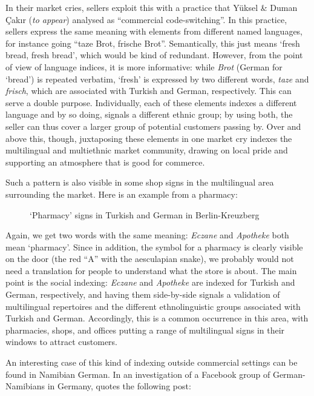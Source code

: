In their market cries, sellers exploit this with a practice that Yüksel \& Duman Çakır (\textit{to appear}) analysed as “commercial code-switching”. In this practice, sellers express the same meaning with elements from different named languages, for instance going “taze Brot, frische Brot”. Semantically, this just means `fresh bread, fresh bread', which would be kind of redundant. However, from the point of view of language indices, it is more informative: while \textit{Brot} (German for ‘bread’) is repeated verbatim, ‘fresh’ is expressed by two different words, \textit{taze} and \textit{frisch}, which are associated with Turkish and German, respectively. This can serve a double purpose. Individually, each of these elements indexes a different language and by so doing, signals a different ethnic group; by using both, the seller can thus cover a larger group of potential customers passing by. Over and above this, though, juxtaposing these elements in one market cry indexes the multilingual and multiethnic market community, drawing on local pride and supporting an atmosphere that is good for commerce.


Such a pattern is also visible in some shop signs in the multilingual area surrounding the market. Here is an example from a pharmacy:


\begin{figure}
\caption{`Pharmacy' signs in Turkish and German in Berlin-Kreuzberg}
\end{figure}

Again, we get two words with the same meaning: \textit{Eczane} and \textit{Apotheke} both mean `pharmacy'. Since in addition, the symbol for a pharmacy is clearly visible on the door (the red “A” with the aesculapian snake), we probably would not need a translation for people to understand what the store is about. The main point is the social indexing: \textit{Eczane} and \textit{Apotheke} are indexed for Turkish and German, respectively, and having them side-by-side signals a validation of multilingual repertoires and the different ethnolinguistic groups associated with Turkish and German. Accordingly, this is a common occurrence in this area, with pharmacies, shops, and offices putting a range of multilingual signs in their windows to attract customers.

An interesting case of this kind of indexing outside commercial settings can be found in Namibian German. In an investigation of a Facebook group of German-Namibians in Germany, \citet[468]{Radke2021} quotes the following post:

